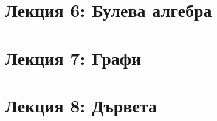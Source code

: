 \documentclass[fleqn, 12pt]{article}
\begin{document}
\newpage

\section{Лекция 6: Булева алгебра }



\newpage

\section{Лекция 7: Графи }



\newpage

\section{Лекция 8: Дървета }
\end{document}
